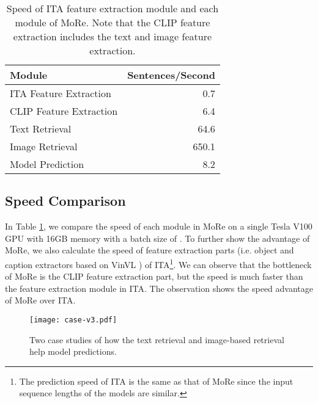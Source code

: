 \documentclass[11pt]{article}
\begin{document}
\begin{table}[t!]
\small
\setlength\tabcolsep{4pt}
\centering
\begin{tabular}{lr}
\toprule
Module &	Sentences/Second\\
\midrule
ITA Feature Extraction & 0.7 \\
CLIP Feature Extraction & 6.4\\
Text Retrieval & 64.6\\
Image Retrieval & 650.1\\
Model Prediction & 8.2 \\
\bottomrule
\end{tabular}
\caption{Speed of ITA feature extraction module and each module of MoRe. Note that the CLIP feature extraction includes the text and image feature extraction.}
\label{tab:speed}
\end{table}

\subsection{Speed Comparison}
In Table \ref{tab:speed}, we compare the speed of each module in MoRe on a single Tesla V100 GPU with 16GB memory with a batch size of . To further show the advantage of MoRe, we also calculate the speed of feature extraction parts (i.e. object and caption extractors based on VinVL \citep{zhang2021vinvl}) of ITA\footnote{The prediction speed of ITA is the same as that of MoRe since the input sequence lengths of the models are similar.}. We can observe that the bottleneck of MoRe is the CLIP feature extraction part, but the speed is much faster than the feature extraction module in ITA. The observation shows the speed advantage of MoRe over ITA.



\begin{figure*}
	\centering
	\texttt{[image: case-v3.pdf]}
	\caption{Two case studies of how the text retrieval and image-based retrieval help model predictions.}
	\label{fig:cases2}
\end{figure*}
\end{document}
